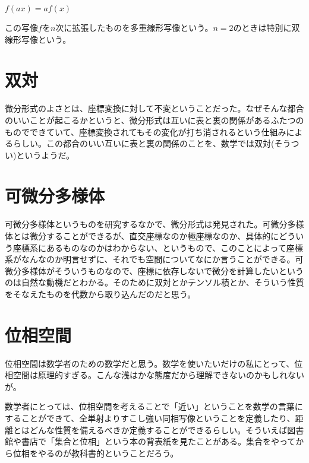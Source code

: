 $ f(ax) = a f(x) $

この写像$f$を$n$次に拡張したものを多重線形写像という。$n=2$のときは特別に双線形写像という。

\newpage


\section{双対}

微分形式のよさとは、座標変換に対して不変ということだった。なぜそんな都合のいいことが起こるかというと、微分形式は互いに表と裏の関係があるふたつのものでできていて、座標変換されてもその変化が打ち消されるという仕組みによるらしい。この都合のいい互いに表と裏の関係のことを、数学では双対(そうつい)というようだ。

\newpage


\section{可微分多様体}

可微分多様体というものを研究するなかで、微分形式は発見された。可微分多様体とは微分することができるが、直交座標なのか極座標なのか、具体的にどういう座標系にあるものなのかはわからない、というもので、このことによって座標系がなんなのか明言せずに、それでも空間についてなにか言うことができる。可微分多様体がそういうものなので、座標に依存しないで微分を計算したいというのは自然な動機だとわかる。そのために双対とかテンソル積とか、そういう性質をそなえたものを代数から取り込んだのだと思う。

\newpage


\section{位相空間}

位相空間は数学者のための数学だと思う。数学を使いたいだけの私にとって、位相空間は原理的すぎる。こんな浅はかな態度だから理解できないのかもしれないが。

数学者にとっては、位相空間を考えることで「近い」ということを数学の言葉にすることができて、全単射よりすこし強い同相写像ということを定義したり、距離とはどんな性質を備えるべきか定義することができるらしい。そういえば図書館や書店で「集合と位相」という本の背表紙を見たことがある。集合をやってから位相をやるのが教科書的ということだろう。

\newpage

\newpage

